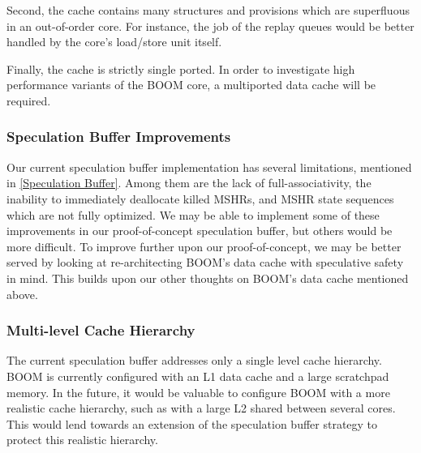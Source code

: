 Second, the cache contains many structures and provisions which are superfluous in an out-of-order core.
For instance, the job of the replay queues would be better handled by the core's load/store unit itself.

Finally, the cache is strictly single ported. In order to investigate high performance variants of the BOOM core,
a multiported data cache will be required.

\subsubsection{Speculation Buffer Improvements}
Our current speculation buffer implementation has several limitations, mentioned in \ref{Speculation Buffer}.
Among them are the lack of full-associativity, the inability to immediately deallocate killed MSHRs, and MSHR state sequences which are not fully optimized.
We may be able to implement some of these improvements in our proof-of-concept speculation buffer, but others would be more difficult. To improve further upon
our proof-of-concept, we may be better served by looking at re-architecting BOOM's data cache with speculative safety in mind. This builds upon our other thoughts
on BOOM's data cache mentioned above.

\subsubsection{Multi-level Cache Hierarchy}
The current speculation buffer addresses only a single level cache hierarchy.
BOOM is currently configured with an L1 data cache and a large scratchpad memory.
In the future, it would be valuable to configure BOOM with a more realistic cache hierarchy,
such as with a large L2 shared between several cores. This would lend towards an extension of the speculation
buffer strategy to protect this realistic hierarchy.
